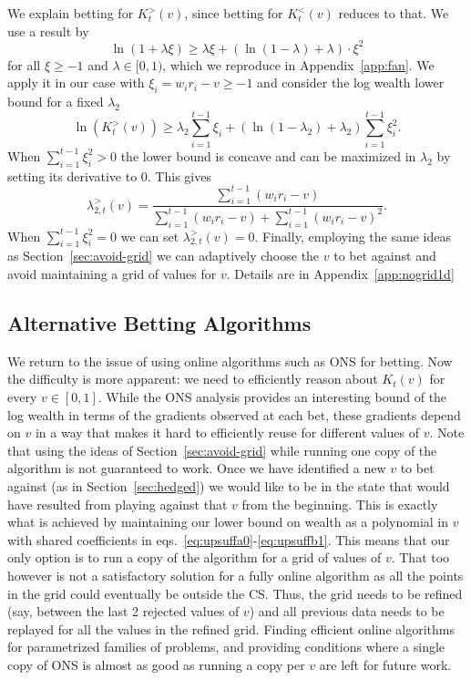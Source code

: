 We explain betting for $K_t^{>}(v)$, since betting for $K_t^{<}(v)$ reduces to
that.  We use a result by \cite{fan2015exponential}
\[
\ln(1+\lambda \xi) \geq \lambda \xi+\left(\ln\left(1-\lambda\right)+\lambda\right)\cdot \xi^{2}
\]
for all $\xi\geq -1$ and $\lambda \in [0,1)$, which we reproduce in
Appendix~\ref{app:fan}.  We apply it in our case with $\xi_i=w_ir_i-v\geq -1$
and consider the log wealth lower bound for a fixed $\lambda_2$
\[
\ln(K_t^{>}(v)) \geq \lambda_2 \sum_{i=1}^{t-1} \xi_i + \left(\ln\left(1-\lambda_2\right)+\lambda_2\right) \sum_{i=1}^{t-1} \xi_i^2.
\]
When $\sum_{i=1}^{t-1} \xi_i^2>0$ the lower bound is concave and can 
be maximized in $\lambda_2$ by setting its derivative to 0. This gives
\[
\lambda_{2,t}^{>}(v) = \frac{\sum_{i=1}^{t-1} (w_i r_i -v)}{\sum_{i=1}^{t-1} (w_i r_i -v)+\sum_{i=1}^{t-1} (w_i r_i -v)^2}.
\]
When $\sum_{i=1}^{t-1} \xi_i^2=0$ we can set $\lambda_{2,t}^{>}(v)=0$.
Finally, employing the same ideas as Section~\ref{sec:avoid-grid} we can
adaptively choose the $v$ to bet against and avoid maintaining a grid of values
for $v$. Details are in Appendix~\ref{app:nogrid1d}

\subsection{Alternative Betting Algorithms}
\label{sec:altbet}
We return to the issue of using online algorithms such as ONS for betting.
Now the difficulty is more apparent: we need to efficiently reason about 
$K_t(v)$ for every $v \in [0,1]$.
While the ONS analysis provides an interesting bound of the log wealth in terms
of the gradients observed at each bet, these gradients depend on $v$ in a way
that makes it hard to efficiently reuse for different values of $v$.  Note that using the
ideas of Section~\ref{sec:avoid-grid} while running one copy of the algorithm
is not guaranteed to work. Once we have identified a new $v$ to bet against (as
in Section~\ref{sec:hedged}) we would like to be in the state that would have
resulted from playing against that $v$ from the beginning. This is exactly what
is achieved by maintaining our lower bound on wealth as a polynomial in $v$
with shared coefficients in eqs.~\eqref{eq:upsuffa0}-\eqref{eq:upsuffb1}.  This
means that our only option is to run a copy of the algorithm for a grid of
values of $v$. That too however is not a satisfactory solution for a fully
online algorithm as all the points in the grid could eventually be outside the
CS. Thus, the grid needs to be refined (say, between the last 2 rejected values
of $v$) and all previous data needs to be replayed for all the values in the
refined grid. Finding efficient online algorithms for parametrized families of
problems, and providing conditions where a single copy of ONS is almost as good
as running a copy per $v$ are left for future work.


